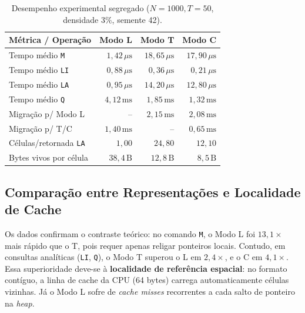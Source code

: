 \documentclass[letterpaper]{article}
\begin{document}
\begin{table}[h]
\centering
\small
\begin{tabular}{lrrr}
\toprule
\textbf{Métrica / Operação} & \textbf{Modo L} & \textbf{Modo T} & \textbf{Modo C} \\
\midrule
Tempo médio \texttt{M} & $1{,}42\,\mu\text{s}$ & $18{,}65\,\mu\text{s}$ & $17{,}90\,\mu\text{s}$ \\
Tempo médio \texttt{LI} & $0{,}88\,\mu\text{s}$ & $0{,}36\,\mu\text{s}$ & $0{,}21\,\mu\text{s}$ \\
Tempo médio \texttt{LA} & $0{,}95\,\mu\text{s}$ & $14{,}20\,\mu\text{s}$ & $12{,}80\,\mu\text{s}$ \\
Tempo médio \texttt{Q} & $4{,}12\,\text{ms}$ & $1{,}85\,\text{ms}$ & $1{,}32\,\text{ms}$ \\
Migração p/ Modo L & -- & $2{,}15\,\text{ms}$ & $2{,}08\,\text{ms}$ \\
Migração p/ T/C & $1{,}40\,\text{ms}$ & -- & $0{,}65\,\text{ms}$ \\
\midrule
Células/retornada \texttt{LA} & $1{,}00$ & $24{,}80$ & $12{,}10$ \\
Bytes vivos por célula & $38{,}4\,\text{B}$ & $12{,}8\,\text{B}$ & $8{,}5\,\text{B}$ \\
\bottomrule
\end{tabular}
\caption{Desempenho experimental segregado ($N=1000, T=50$, densidade $3\%$, semente 42).}
\label{tab:experimentos}
\end{table}

\subsection{Comparação entre Representações e Localidade de Cache}
Os dados confirmam o contraste teórico: no comando \texttt{M}, o Modo L foi $13{,}1\times$ mais rápido que o T, pois requer apenas religar ponteiros locais. Contudo, em consultas analíticas (\texttt{LI}, \texttt{Q}), o Modo T superou o L em $2{,}4\times$, e o C em $4{,}1\times$. Essa superioridade deve-se à \textbf{localidade de referência espacial}: no formato contíguo, a linha de cache da CPU (64 bytes) carrega automaticamente células vizinhas. Já o Modo L sofre de \textit{cache misses} recorrentes a cada salto de ponteiro na \textit{heap}. 
\end{document}
